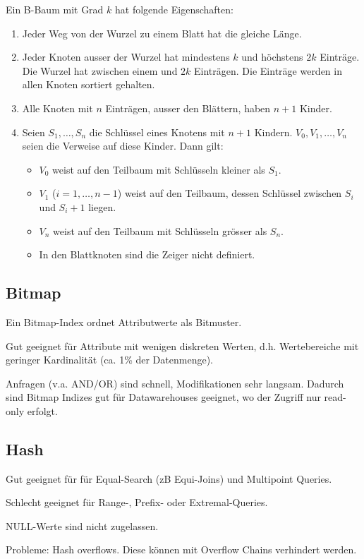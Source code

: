 Ein B-Baum mit Grad $k$ hat folgende Eigenschaften:

\begin{enumerate}
	\item Jeder Weg von der Wurzel zu einem Blatt hat die gleiche Länge.
	\item Jeder Knoten ausser der Wurzel hat mindestens $k$ und höchstens $2k$
		Einträge. Die Wurzel hat zwischen einem und $2k$ Einträgen. Die Einträge
		werden in allen Knoten sortiert gehalten.
	\item Alle Knoten mit $n$ Einträgen, ausser den Blättern, haben $n+1$ Kinder.
	\item Seien $S_1, \ldots, S_n$ die Schlüssel eines Knotens mit $n+1$ Kindern.
		$V_0, V_1, \ldots, V_n$ seien die Verweise auf diese Kinder. Dann gilt:
		\begin{itemize}
			\item $V_0$ weist auf den Teilbaum mit Schlüsseln kleiner als $S_1$.
			\item $V_1$ ($i=1, \ldots, n-1$) weist auf den Teilbaum, dessen Schlüssel
				zwischen $S_i$ und $S_i+1$ liegen.
			\item $V_n$ weist auf den Teilbaum mit Schlüsseln grösser als $S_n$.
			\item In den Blattknoten sind die Zeiger nicht definiert.
		\end{itemize}
\end{enumerate}


\subsection{Bitmap}

Ein Bitmap-Index ordnet Attributwerte als Bitmuster.

Gut geeignet für Attribute mit wenigen diskreten Werten, d.h. Wertebereiche mit
geringer Kardinalität (ca. 1\% der Datenmenge).

Anfragen (v.a. AND/OR) sind schnell, Modifikationen sehr langsam. Dadurch sind
Bitmap Indizes gut für Datawarehouses geeignet, wo der Zugriff nur read-only
erfolgt.


\subsection{Hash}

Gut geeignet für für Equal-Search (zB Equi-Joins) und Multipoint Queries.

Schlecht geeignet für Range-, Prefix- oder Extremal-Queries.

NULL-Werte sind nicht zugelassen.

Probleme: Hash overflows. Diese können mit Overflow Chains verhindert werden.
